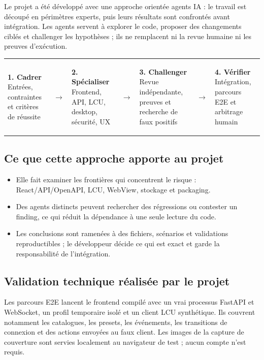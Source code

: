 \documentclass[10pt,a4paper]{article}
\newcommand{\softbox}[1]{%
  \colorbox{panel}{\parbox{0.96\linewidth}{\vspace{5pt}#1\vspace{5pt}}}}
\begin{document}
Le projet a été développé avec une approche orientée agents IA : le travail est découpé en périmètres experts, puis leurs résultats sont confrontés avant intégration. Les agents servent à explorer le code, proposer des changements ciblés et challenger les hypothèses ; ils ne remplacent ni la revue humaine ni les preuves d'exécution.

\begin{center}
\begin{tabularx}{\textwidth}{@{}>{\centering\arraybackslash}Xc>{\centering\arraybackslash}Xc>{\centering\arraybackslash}Xc>{\centering\arraybackslash}X@{}}
\softbox{\centering\textbf{1. Cadrer}\\Entrées, contraintes et critères de réussite}
& $\rightarrow$ &
\softbox{\centering\textbf{2. Spécialiser}\\Frontend, API, LCU, desktop, sécurité, UX}
& $\rightarrow$ &
\softbox{\centering\textbf{3. Challenger}\\Revue indépendante, preuves et recherche de faux positifs}
& $\rightarrow$ &
\softbox{\centering\textbf{4. Vérifier}\\Intégration, parcours E2E et arbitrage humain}
\\
\end{tabularx}
\end{center}

\subsection*{Ce que cette approche apporte au projet}
\begin{itemize}
  \item Elle fait examiner les frontières qui concentrent le risque : React/API/OpenAPI, LCU, WebView, stockage et packaging.
  \item Des agents distincts peuvent rechercher des régressions ou contester un finding, ce qui réduit la dépendance à une seule lecture du code.
  \item Les conclusions sont ramenées à des fichiers, scénarios et validations reproductibles ; le développeur décide ce qui est exact et garde la responsabilité de l'intégration.
\end{itemize}

\subsection*{Validation technique réalisée par le projet}
Les parcours E2E lancent le frontend compilé avec un vrai processus FastAPI et WebSocket, un profil temporaire isolé et un client LCU synthétique. Ils couvrent notamment les catalogues, les presets, les événements, les transitions de connexion et des actions envoyées au faux client. Les images de la capture de couverture sont servies localement au navigateur de test ; aucun compte n'est requis.
\end{document}
